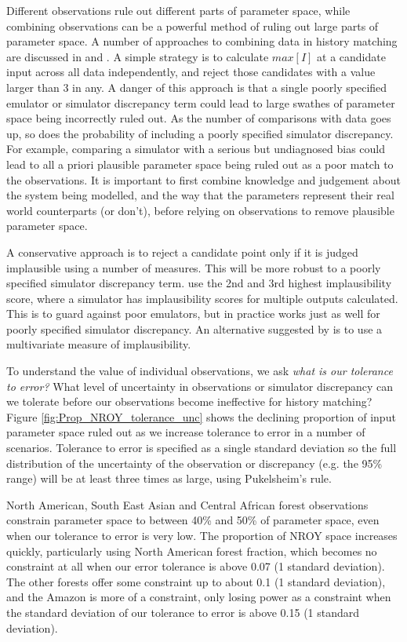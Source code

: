 \documentclass[esd, manuscript]{copernicus}
\begin{document}
Different observations rule out different parts of parameter space, while combining observations can be a powerful method of ruling out large parts of parameter space. A number of approaches to combining data in history matching are discussed in \cite{vernon2010galaxy} and \cite{williamson2013history}. A simple strategy is to calculate $max[I]$ at a candidate input across all data independently, and reject those candidates with a value larger than 3 in any. A danger of this approach is that a single poorly specified emulator or simulator discrepancy term could lead to large swathes of parameter space being incorrectly ruled out. As the number of comparisons with data goes up, so does the probability of including a poorly specified simulator discrepancy. For example, comparing a simulator with a serious but undiagnosed bias could lead to all a priori plausible parameter space being ruled out as a poor match to the observations. It is important to first combine knowledge and judgement about the system being modelled, and the way that the parameters represent their real world counterparts (or don't), before relying on observations to remove plausible parameter space.

A conservative approach is to reject a candidate point only if it is judged implausible using a number of measures. This will be more robust to a poorly specified simulator discrepancy term. \cite{vernon2010galaxy} use the 2nd and 3rd highest implausibility score, where a simulator has implausibility scores for multiple outputs calculated. This is to guard against poor emulators, but in practice works just as well for poorly specified simulator discrepancy. An alternative suggested by \cite{vernon2010galaxy} is to use a multivariate measure of implausibility.

To understand the value of individual observations, we ask \emph{what is our tolerance to error?} What level of uncertainty in observations or simulator discrepancy can we tolerate before our observations become ineffective for history matching? Figure \ref{fig:Prop_NROY_tolerance_unc} shows the declining proportion of input parameter space ruled out as we increase tolerance to error in a number of scenarios. Tolerance to error is specified as a single standard deviation so the full distribution of the uncertainty of the observation or discrepancy (e.g. the 95\% range) will be at least three times as large, using Pukelsheim's rule.

North American, South East Asian and Central African forest observations constrain parameter space to between 40\% and 50\% of parameter space, even when our tolerance to error is very low. The proportion of NROY space increases quickly, particularly using North American forest fraction, which becomes no constraint at all when our error tolerance is above 0.07 (1 standard deviation). The other forests offer some constraint up to about 0.1 (1 standard deviation), and the Amazon is more of a constraint, only losing power as a constraint when the standard deviation of our tolerance to error is above 0.15 (1 standard deviation).
\end{document}
